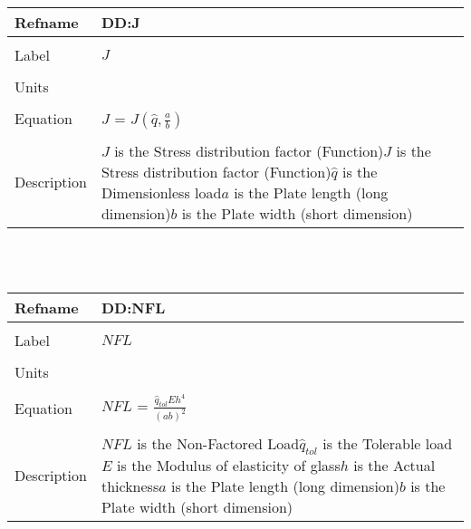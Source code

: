 \documentclass[12pt]{article}
\begin{document}
~\newline
\noindent \begin{minipage}{\textwidth}
\begin{tabular}{p{} p{}}
\toprule \textbf{Refname} & \textbf{DD:J}
\label{DD:J}
\\ \midrule \\
Label & $J$
\\ \midrule \\
Units & 
\\ \midrule \\
Equation & $J$ = $J(\hat{q},\frac{a}{b})$
\\ \midrule \\
Description & $J$ is the Stress distribution factor (Function)\newline$J$ is the Stress distribution factor (Function)\newline$\hat{q}$ is the Dimensionless load\newline$a$ is the Plate length (long dimension)\newline$b$ is the Plate width (short dimension)
\\ \bottomrule \end{tabular}
\end{minipage}\\
~\newline
\noindent \begin{minipage}{\textwidth}
\begin{tabular}{p{} p{}}
\toprule \textbf{Refname} & \textbf{DD:NFL}
\label{DD:NFL}
\\ \midrule \\
Label & $NFL$
\\ \midrule \\
Units & 
\\ \midrule \\
Equation & $NFL$ = $\frac{\hat{q}_{tol}Eh^{4}}{(ab)^{2}}$
\\ \midrule \\
Description & $NFL$ is the Non-Factored Load\newline$\hat{q}_{tol}$ is the Tolerable load\newline$E$ is the Modulus of elasticity of glass\newline$h$ is the Actual thickness\newline$a$ is the Plate length (long dimension)\newline$b$ is the Plate width (short dimension)
\\ \bottomrule \end{tabular}
\end{minipage}\\
\end{document}
